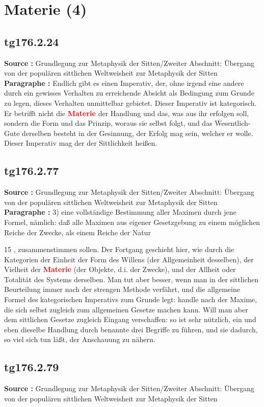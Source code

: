 \documentclass[a4paper,12pt,twoside]{book}
\newcommand{\match}[1]{\textcolor{red}{\textbf{#1}}}
\newcommand{\unnumberedsection}[1]{
	\section*{#1}
	\addcontentsline{toc}{section}{#1}
	\markright{#1}
}
\begin{document}
	\unnumberedsection{Materie (4)} 
	\subsection*{tg176.2.24} 
	\textbf{Source : }Grundlegung zur Metaphysik der Sitten/Zweiter Abschnitt: Übergang von der populären sittlichen Weltweisheit zur Metaphysik der Sitten\\  
	
	\noindent\textbf{Paragraphe : }Endlich gibt es einen Imperativ, der, ohne irgend eine andere durch ein gewisses Verhalten zu erreichende Absicht als Bedingung zum Grunde zu legen, dieses Verhalten unmittelbar gebietet. Dieser Imperativ ist kategorisch. Er betrifft nicht die \match{Materie} der Handlung und das, was aus ihr erfolgen soll, sondern die Form und das Prinzip, woraus sie selbst folgt, und das Wesentlich-Gute derselben besteht in der Gesinnung, der Erfolg mag sein, welcher er wolle. Dieser Imperativ mag der der Sittlichkeit heißen. 
	
	\subsection*{tg176.2.77} 
	\textbf{Source : }Grundlegung zur Metaphysik der Sitten/Zweiter Abschnitt: Übergang von der populären sittlichen Weltweisheit zur Metaphysik der Sitten\\  
	
	\noindent\textbf{Paragraphe : }3) eine vollständige Bestimmung aller Maximen durch jene Formel, nämlich: daß alle Maximen aus eigener Gesetzgebung zu einem möglichen Reiche der Zwecke, als einem Reiche der Natur
	
	
	15
	, zusammenstimmen sollen. Der Fortgang geschieht hier, wie durch die Kategorien der Einheit der Form des Willens (der Allgemeinheit desselben), der Vielheit der \match{Materie} (der Objekte, d.i. der Zwecke), und der Allheit oder Totalität des Systems derselben. Man tut aber besser, wenn man in der sittlichen Beurteilung immer nach der strengen Methode verfährt, und die allgemeine Formel des kategorischen Imperativs zum Grunde legt: handle nach der Maxime, die sich selbst zugleich zum allgemeinen Gesetze machen kann. Will man aber dem sittlichen Gesetze zugleich Eingang verschaffen: so ist sehr nützlich, ein und eben dieselbe Handlung durch benannte drei Begriffe zu führen, und sie dadurch, so viel sich tun läßt, der Anschauung zu nähern. 
	
	\subsection*{tg176.2.79} 
	\textbf{Source : }Grundlegung zur Metaphysik der Sitten/Zweiter Abschnitt: Übergang von der populären sittlichen Weltweisheit zur Metaphysik der Sitten\\  
	
\end{document}
